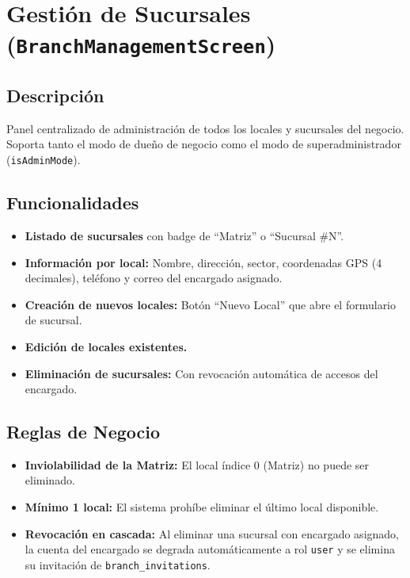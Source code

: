 \documentclass[11pt, a4paper, oneside]{report}
\begin{document}
\section{Gestión de Sucursales (\texttt{BranchManagementScreen})}

\subsection{Descripción}
Panel centralizado de administración de todos los locales y sucursales del negocio. Soporta tanto el modo de dueño de negocio como el modo de superadministrador (\texttt{isAdminMode}).

\subsection{Funcionalidades}
\begin{itemize}
  \item \textbf{Listado de sucursales} con badge de ``Matriz'' o ``Sucursal \#N''.
  \item \textbf{Información por local:} Nombre, dirección, sector, coordenadas GPS (4 decimales), teléfono y correo del encargado asignado.
  \item \textbf{Creación de nuevos locales:} Botón ``Nuevo Local'' que abre el formulario de sucursal.
  \item \textbf{Edición de locales existentes.}
  \item \textbf{Eliminación de sucursales:} Con revocación automática de accesos del encargado.
\end{itemize}

\subsection{Reglas de Negocio}
\begin{itemize}
  \item \textbf{Inviolabilidad de la Matriz:} El local índice 0 (Matriz) no puede ser eliminado.
  \item \textbf{Mínimo 1 local:} El sistema prohíbe eliminar el último local disponible.
  \item \textbf{Revocación en cascada:} Al eliminar una sucursal con encargado asignado, la cuenta del encargado se degrada automáticamente a rol \texttt{user} y se elimina su invitación de \texttt{branch\_invitations}.
\end{itemize}

\end{document}
